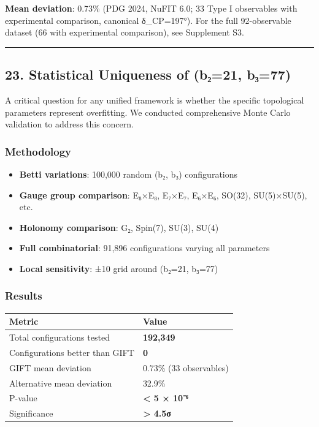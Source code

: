\documentclass[11pt,a4paper]{article}
\begin{document}
\textbf{Mean deviation}: 0.73\% (PDG 2024, NuFIT 6.0; 33 Type I observables with experimental comparison, canonical δ\_CP=197°). For the full 92-observable dataset (66 with experimental comparison), see Supplement S3.

\begin{center}\rule{0.5\linewidth}{0.5pt}\end{center}

\subsection{23. Statistical Uniqueness of (b₂=21, b₃=77)}\label{statistical-uniqueness-of-bux208221-bux208377}

A critical question for any unified framework is whether the specific topological parameters represent overfitting. We conducted comprehensive Monte Carlo validation to address this concern.

\subsubsection{Methodology}\label{methodology}

\begin{itemize}
\item
  \textbf{Betti variations}: 100,000 random (b₂, b₃) configurations
\item
  \textbf{Gauge group comparison}: E₈×E₈, E₇×E₇, E₆×E₆, SO(32), SU(5)×SU(5), etc.
\item
  \textbf{Holonomy comparison}: G₂, Spin(7), SU(3), SU(4)
\item
  \textbf{Full combinatorial}: 91,896 configurations varying all parameters
\item
  \textbf{Local sensitivity}: ±10 grid around (b₂=21, b₃=77)
\end{itemize}

\subsubsection{Results}\label{results}

{\def\LTcaptype{none} %
\begin{longtable}[]{@{}ll@{}}
\toprule\noalign{}
Metric & Value \\
\midrule\noalign{}
\endhead
\bottomrule\noalign{}
\endlastfoot
Total configurations tested & \textbf{192,349} \\
Configurations better than GIFT & \textbf{0} \\
GIFT mean deviation & 0.73\% (33 observables) \\
Alternative mean deviation & 32.9\% \\
P-value & \textbf{\textless{} 5 × 10⁻⁶} \\
Significance & \textbf{\textgreater{} 4.5σ} \\
\end{longtable}
}
\end{document}
